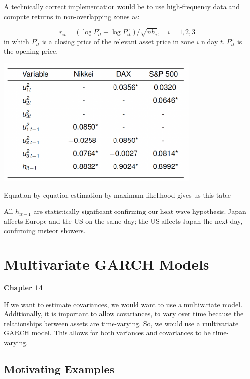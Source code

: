 \documentclass[11pt]{article}
\begin{document}
\begin{procedure}
    A technically correct implementation would be to use high-frequency data and compute returns in non-overlapping zones as:

    \begin{equation}
r_{i t}=\left(\log P_{i t}^c-\log P_{i t}^o\right) / \sqrt{n h_i}, \quad i=1,2,3
\end{equation}
in which $P_{it}^c$ is a closing price of the relevant asset price in zone $i$ n day $t$. $P_{it}^o$ is the opening price.
\end{procedure}

\begin{table}[ht]
    \centering
    \includegraphics[width=10cm]{pics/heatwave meteor.png}
    \caption{Equation-by-equation estimation by maximum likelihood gives us this table}
    \label{tab: heatwaves and meteor showers}
\end{table}

All $h_{it-1}$ are statistically significant confirming our heat wave hypothesis. Japan affects Europe and the US on the same day; the US affects Japan the next day, confirming meteor showers.

\clearpage
\newpage
\section{Multivariate GARCH Models}
\textbf{Chapter 14}

If we want to estimate covariances, we would want to use a multivariate model. Additionally, it is important to allow covariances, to vary over time because the relationships between assets are time-varying. So, we would use a multivariate GARCH model. This allows for both variances and covariances to be time-varying.

\subsection{Motivating Examples}
\end{document}
